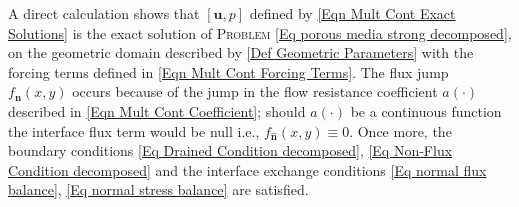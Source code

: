 \documentclass[3p]{elsarticle}
\def\u{\mathbf u}
\def\flux{f_{\bm{\hat{n}} } }
\begin{document}
\begin{example}
%
%
A direct calculation shows that $[\u, p]$ defined by \eqref{Eqn Mult Cont Exact Solutions}
is the exact solution of \textsc{Problem} \eqref{Eq porous media strong decomposed}, on the geometric domain described by \eqref{Def Geometric Parameters} with the forcing terms defined in \eqref{Eqn Mult Cont Forcing Terms}. The flux jump $ \flux (x,y) $ occurs because of the jump in the flow resistance coefficient $ a(\cdot) $ described in  \eqref{Eqn Mult Cont Coefficient}; should $ a(\cdot) $ be a continuous function the interface flux term would be null i.e., $ \flux (x,y)  \equiv 0 $. Once more, the boundary conditions \eqref{Eq Drained Condition decomposed}, \eqref{Eq Non-Flux Condition decomposed} and the interface exchange conditions \eqref{Eq normal flux balance}, \eqref{Eq normal stress balance} are satisfied.


\end{example}
\end{document}
